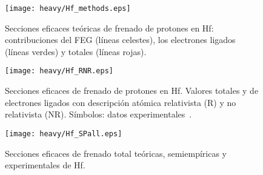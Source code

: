 \begin{figure}
\centering
\vspace{-0.8cm}
\texttt{[image: heavy/Hf\_methods.eps]}
\vspace{-0.2cm}
\caption[Secciones eficaces teóricas de frenado de protones en Hf.]
{Secciones eficaces teóricas de frenado de protones en Hf: 
contribuciones del FEG (líneas celestes), los electrones ligados 
(líneas verdes) y totales (líneas rojas).} 
\label{fig:Hf_methods}

\vspace{0.3cm}
\texttt{[image: heavy/Hf\_RNR.eps]}
\vspace{-0.2cm}
\caption[Secciones eficaces relativistas y no relativistas de Hf.]
{Secciones eficaces de frenado de protones en Hf. Valores totales y 
de electrones ligados con descripción atómica relativista (R) y no 
relativista (NR). 
Símbolos: datos experimentales~\cite{Montanari:20,Sirotinin:84}.}
\label{fig:Hf_SP}
\end{figure}


\begin{figure}[t]
\centering
\texttt{[image: heavy/Hf\_SPall.eps]}
\caption[Secciones eficaces teóricas, semiempíricas y experimentales de 
Hf.]{Secciones eficaces de frenado total teóricas, semiempíricas y
experimentales de Hf.}
\label{fig:Hf_SPall}
\end{figure}

